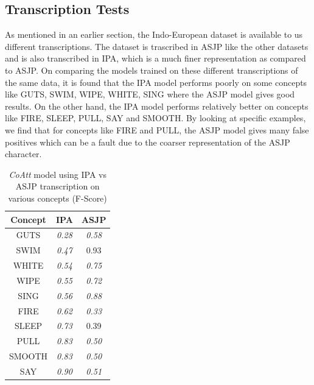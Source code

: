 \documentclass[11pt,letterpaper]{article}
\begin{document}
\subsection{Transcription Tests}

As mentioned in an earlier section, the Indo-European dataset is available to us different transcriptions. The dataset is trascribed in ASJP like the other datasets and is also transcribed in IPA, which is a much finer representation as compared to ASJP. On comparing the models trained on these different transcriptions of the same data, it is found that the IPA model performs poorly on some concepts like GUTS, SWIM, WIPE, WHITE, SING where the ASJP model gives good results. On the other hand, the IPA model performs relatively better on concepts like FIRE, SLEEP, PULL, SAY and SMOOTH. By looking at specific examples, we find that for concepts like FIRE and PULL, the ASJP model gives many false positives which can be a fault due to the coarser representation of the ASJP character.

\begin{table}[h]
\centering
\begin{tabular}{ccc}
\textbf{Concept} & \textbf{IPA}  & \textbf{ASJP} \\ \hline
GUTS             & \textit{0.28} & \textit{0.58} \\
SWIM             & \textit{0.47} & 0.93          \\
WHITE            & \textit{0.54} & \textit{0.75} \\
WIPE             & \textit{0.55} & \textit{0.72} \\
SING             & \textit{0.56} & \textit{0.88} \\ \hline
FIRE             & \textit{0.62} & \textit{0.33} \\
SLEEP            & \textit{0.73} & 0.39          \\
PULL             & \textit{0.83} & \textit{0.50} \\
SMOOTH           & \textit{0.83} & \textit{0.50} \\
SAY              & \textit{0.90} & \textit{0.51}
\end{tabular}
\caption{\textit{CoAtt} model using IPA vs ASJP transcription on various concepts (F-Score)}
\end{table}
\end{document}

